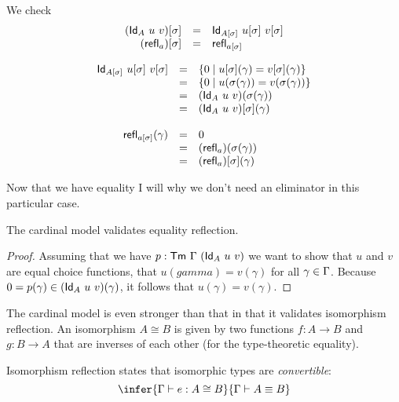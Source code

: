 We check
\[
  \begin{array}{rcl}
    (\mathsf{Id}_A\ u\ v)[\sigma] &=& \mathsf{Id}_{A[\sigma]}\ u[\sigma]\ v[\sigma] \\
    (\mathsf{refl}_a)[\sigma] &=& \mathsf{refl}_{a[\sigma]}
  \end{array}
\]

\[
  \begin{array}{rcl}
    \mathsf{Id}_{A[\sigma]}\ u[\sigma]\ v[\sigma]
    &=& \{ 0 \mid u[\sigma](\gamma) = v[\sigma](\gamma) \} \\
    &=& \{ 0 \mid u(\sigma(\gamma)) = v(\sigma(\gamma)) \} \\
    &=& (\mathsf{Id}_A\ u\ v)(\sigma(\gamma)) \\
    &=& (\mathsf{Id}_A\ u\ v)[\sigma](\gamma) \\
    \\
    \mathsf{refl}_{a[\sigma]}(\gamma)
    &=& 0 \\
    &=& (\mathsf{refl}_a)(\sigma(\gamma)) \\
    &=& (\mathsf{refl}_a)[\sigma](\gamma)
  \end{array}
\]

Now that we have equality I will why we don't need an eliminator in this
particular case.

\begin{theorem}
  The cardinal model validates equality reflection.
\end{theorem}
%
%
\begin{proof}
  Assuming that we have \(p : \mathsf{Tm}\ \Gamma\ (\mathsf{Id}_A\ u\ v)\) we want to show that
  \(u\) and \(v\) are equal choice functions, \ie that \(u(gamma) = v(\gamma)\)
  for all \(\gamma \in \Gamma\).
  Because \(0 = p(\gamma) \in (\mathsf{Id}_A\ u\ v)(\gamma)\), it follows that
  \(u(\gamma) = v(\gamma)\).
\end{proof}

The cardinal model is even stronger than that in that it validates isomorphism
reflection.
An isomorphism \(A \cong B\) is given by two functions \(f : A \to B\)
and \(g : B \to A\) that are inverses of each other (for the type-theoretic
equality).

\begin{definition}
  Isomorphism reflection states that isomorphic types are \emph{convertible}:
  \[
    \infer
      {\Ga \vdash e : A \cong B}
      {\Ga \vdash A \equiv B}
  \]
\end{definition}

